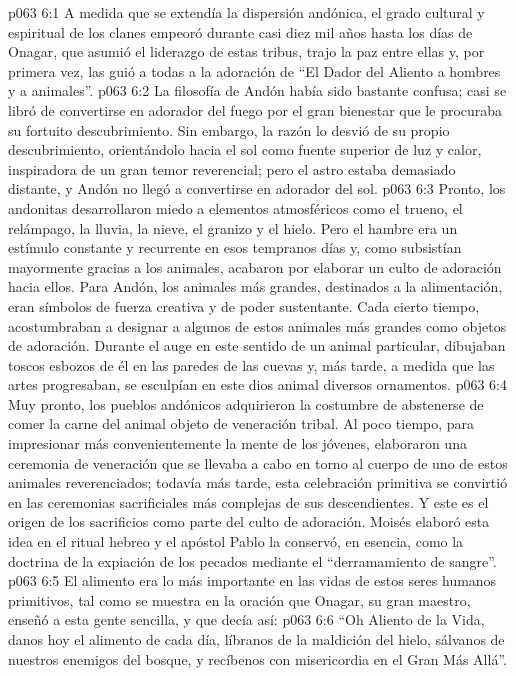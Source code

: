 \vs p063 6:1 A medida que se extendía la dispersión andónica, el grado cultural y espiritual de los clanes empeoró durante casi diez mil años hasta los días de Onagar, que asumió el liderazgo de estas tribus, trajo la paz entre ellas y, por primera vez, las guió a todas a la adoración de “El Dador del Aliento a hombres y a animales”.
\vs p063 6:2 \pc La filosofía de Andón había sido bastante confusa; casi se libró de convertirse en adorador del fuego por el gran bienestar que le procuraba su fortuito descubrimiento. Sin embargo, la razón lo desvió de su propio descubrimiento, orientándolo hacia el sol como fuente superior de luz y calor, inspiradora de un gran temor reverencial; pero el astro estaba demasiado distante, y Andón no llegó a convertirse en adorador del sol.
\vs p063 6:3 Pronto, los andonitas desarrollaron miedo a elementos atmosféricos como el trueno, el relámpago, la lluvia, la nieve, el granizo y el hielo. Pero el hambre era un estímulo constante y recurrente en esos tempranos días y, como subsistían mayormente gracias a los animales, acabaron por elaborar un culto de adoración hacia ellos. Para Andón, los animales más grandes, destinados a la alimentación, eran símbolos de fuerza creativa y de poder sustentante. Cada cierto tiempo, acostumbraban a designar a algunos de estos animales más grandes como objetos de adoración. Durante el auge en este sentido de un animal particular, dibujaban toscos esbozos de él en las paredes de las cuevas y, más tarde, a medida que las artes progresaban, se esculpían en este dios animal diversos ornamentos.
\vs p063 6:4 Muy pronto, los pueblos andónicos adquirieron la costumbre de abstenerse de comer la carne del animal objeto de veneración tribal. Al poco tiempo, para impresionar más convenientemente la mente de los jóvenes, elaboraron una ceremonia de veneración que se llevaba a cabo en torno al cuerpo de uno de estos animales reverenciados; todavía más tarde, esta celebración primitiva se convirtió en las ceremonias sacrificiales más complejas de sus descendientes. Y este es el origen de los sacrificios como parte del culto de adoración. Moisés elaboró esta idea en el ritual hebreo y el apóstol Pablo la conservó, en esencia, como la doctrina de la expiación de los pecados mediante el “derramamiento de sangre”.
\vs p063 6:5 El alimento era lo más importante en las vidas de estos seres humanos primitivos, tal como se muestra en la oración que Onagar, su gran maestro, enseñó a esta gente sencilla, y que decía así:
\vs p063 6:6 “Oh Aliento de la Vida, danos hoy el alimento de cada día, líbranos de la maldición del hielo, sálvanos de nuestros enemigos del bosque, y recíbenos con misericordia en el Gran Más Allá”.
